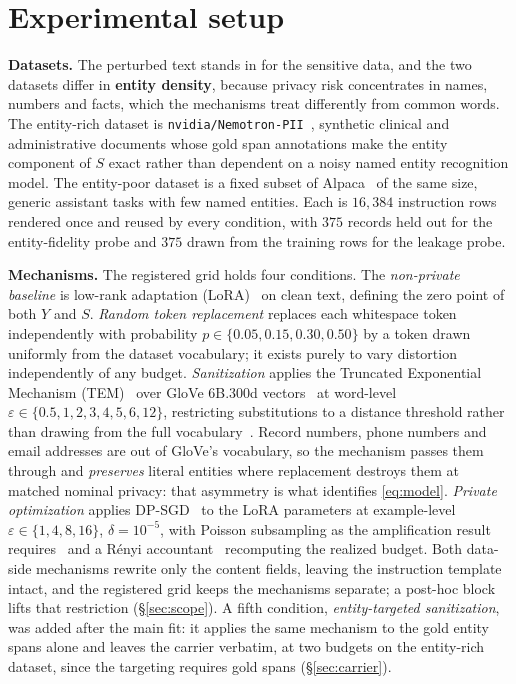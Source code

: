 \section{\label{sec:setup}Experimental setup}
\textbf{Datasets.}
The perturbed text stands in for the sensitive data,
and the two datasets differ in \textbf{entity density},
because privacy risk concentrates in names,
numbers and facts,
which the mechanisms treat differently from common words.
The entity-rich dataset is \texttt{nvidia/Nemotron-PII}~\citep{nvidia2025nemotronpii},
synthetic clinical and administrative documents whose gold span annotations make the entity component of $S$ exact rather than dependent on a noisy named entity recognition model.
The entity-poor dataset is a fixed subset of Alpaca~\citep{taori2023alpaca} of the same size,
generic assistant tasks with few named entities.
Each is $16{,}384$ instruction rows rendered once and reused by every condition,
with $375$ records held out for the entity-fidelity probe and $375$ drawn from the training rows for the leakage probe.

\textbf{\label{sec:mech}Mechanisms.}
The registered grid holds four conditions.
The \textit{non-private baseline} is low-rank adaptation (LoRA)~\citep{hu2022lora} on clean text,
defining the zero point of both $Y$ and $S$. \textit{Random token replacement} replaces each whitespace token independently with probability $p \in \{0.05, 0.15, 0.30, 0.50\}$ by a token drawn uniformly from the dataset vocabulary;
it exists purely to vary distortion independently of any budget.
\textit{Sanitization} applies the Truncated Exponential Mechanism (TEM)~\citep{carvalho2021tem} over GloVe 6B.300d vectors~\citep{pennington2014glove} at word-level $\varepsilon \in \{0.5, 1, 2, 3, 4, 5, 6, 12\}$,
restricting substitutions to a distance threshold rather than drawing from the full vocabulary~\citep{yue2021differential}.
Record numbers,
phone numbers and email addresses are out of GloVe's vocabulary,
so the mechanism passes them through and \textit{preserves} literal entities where replacement destroys them at matched nominal privacy:
that asymmetry is what identifies \eqref{eq:model}.
\textit{Private optimization} applies DP-SGD~\citep{abadi2016deep} to the LoRA parameters at example-level $\varepsilon \in \{1, 4, 8, 16\}$,
$\delta = 10^{-5}$,
with Poisson subsampling as the amplification result requires~\citep{mironov2019sgm} and a R\'enyi accountant~\citep{mironov2017renyi} recomputing the realized budget.
Both data-side mechanisms rewrite only the content fields,
leaving the instruction template intact,
and the registered grid keeps the mechanisms separate;
a post-hoc block lifts that restriction (\S\ref{sec:scope}).
A fifth condition,
\textit{entity-targeted sanitization},
was added after the main fit:
it applies the same mechanism to the gold entity spans alone and leaves the carrier verbatim,
at two budgets on the entity-rich dataset,
since the targeting requires gold spans (\S\ref{sec:carrier}).

